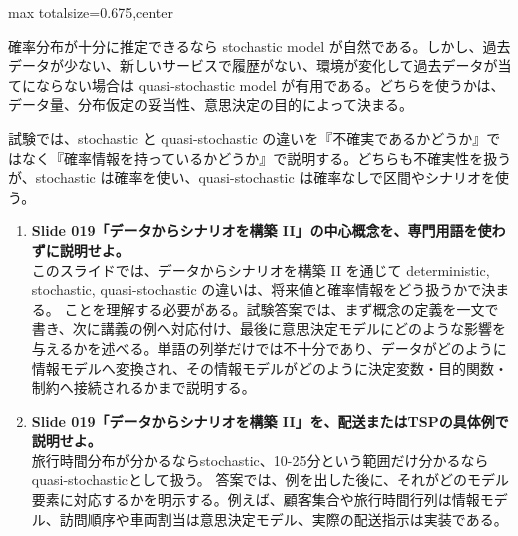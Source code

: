 \begin{adjustbox}{max totalsize={\textwidth}{0.675\textheight},center}
\begin{minipage}{\textwidth}
\begin{minipage}[t]{0.485\textwidth}
確率分布が十分に推定できるなら stochastic model が自然である。しかし、過去データが少ない、新しいサービスで履歴がない、環境が変化して過去データが当てにならない場合は quasi-stochastic model が有用である。どちらを使うかは、データ量、分布仮定の妥当性、意思決定の目的によって決まる。\par
試験では、stochastic と quasi-stochastic の違いを『不確実であるかどうか』ではなく『確率情報を持っているかどうか』で説明する。どちらも不確実性を扱うが、stochastic は確率を使い、quasi-stochastic は確率なしで区間やシナリオを使う。\par
{}
\begin{enumerate}
\item \textbf{Slide 019「データからシナリオを構築 II」の中心概念を、専門用語を使わずに説明せよ。}\\このスライドでは、データからシナリオを構築 II を通じて deterministic, stochastic, quasi-stochastic の違いは、将来値と確率情報をどう扱うかで決まる。 ことを理解する必要がある。試験答案では、まず概念の定義を一文で書き、次に講義の例へ対応付け、最後に意思決定モデルにどのような影響を与えるかを述べる。単語の列挙だけでは不十分であり、データがどのように情報モデルへ変換され、その情報モデルがどのように決定変数・目的関数・制約へ接続されるかまで説明する。
\item \textbf{Slide 019「データからシナリオを構築 II」を、配送またはTSPの具体例で説明せよ。}\\旅行時間分布が分かるならstochastic、10-25分という範囲だけ分かるならquasi-stochasticとして扱う。 答案では、例を出した後に、それがどのモデル要素に対応するかを明示する。例えば、顧客集合や旅行時間行列は情報モデル、訪問順序や車両割当は意思決定モデル、実際の配送指示は実装である。
\end{enumerate}
\end{minipage}
\end{minipage}
\end{adjustbox}

